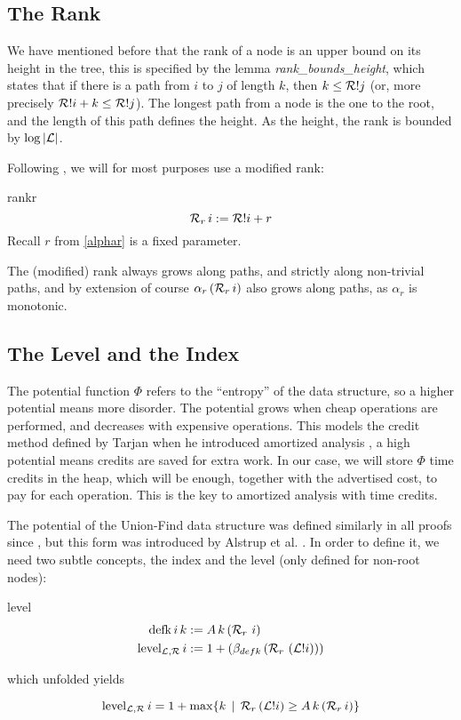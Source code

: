 \documentclass[headsepline,footsepline,footinclude=false,oneside,fontsize=11pt,paper=a4,listof=totoc,bibliography=totoc]{scrbook} %
\begin{document}
\subsection{The Rank}

We have mentioned before that the rank of a node is an upper bound on its height in the tree, this is specified by the lemma \textit{rank\_bounds\_height}, which states that if there is a path from $i$ to $j$ of length $k$, then $k \leq \mathcal{R}!j$ (or, more precisely $\mathcal{R}!i + k \leq \mathcal{R}!j$). The longest path from a node is the one to the root, and the length of this path defines the height. As the height, the rank is bounded by $\log{|\mathcal{L}|}$.

Following \cite{Alstrup14}, we will for most purposes use a modified rank:

\begin{definition}{rankr}
	\begin{equation}
		\mathcal{R}_r \, i := \mathcal{R}!i + r
	\end{equation}
	Recall $r$ from \ref{alphar} is a fixed parameter.
\end{definition}

The (modified) rank always grows along paths, and strictly along non-trivial paths, and by extension of course $\alpha_r \, (\mathcal{R}_r \, i)$ also grows along paths, as $\alpha_r$ is monotonic.

\subsection{The Level and the Index}

The potential function $\Phi$ refers to the ``entropy'' of the data structure, so a higher potential means more disorder. The potential grows when cheap operations are performed, and decreases with expensive operations. This models the credit method defined by Tarjan when he introduced amortized analysis \cite{Tarjan85}, a high potential means credits are saved for extra work. In our case, we will store $\Phi$ time credits in the heap, which will be enough, together with the advertised cost, to pay for each operation. This is the key to amortized analysis with time credits.

The potential of the Union-Find data structure was defined similarly in all proofs since \cite{Tarjan1975b}, but this form was introduced by Alstrup et al. \cite{Alstrup14}. In order to define it, we need two subtle concepts, the index and the level (only defined for non-root nodes):

\begin{definition}{level}
	\begin{align}
	\mathrm{defk}\, i \, k &:= A\, k \, (\mathcal{R}_r\ i) \\
	\mathrm{level}_{\mathcal{L},\mathcal{R}}\, i &:= 1 + (\beta_{defk} \, (\mathcal{R}_r\ (\mathcal{L}!i)))
	\end{align}

	which unfolded yields
	
	\begin{equation}
	\mathrm{level}_{\mathcal{L},\mathcal{R}}\, i = 1 + \max \{k \,\mid\, \mathcal{R}_r \, (\mathcal{L}!i) \geq A\, k \, (\mathcal{R}_r\, i)\}
	\end{equation}
\end{definition}
\end{document}
